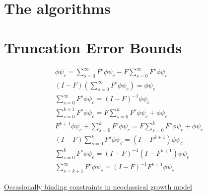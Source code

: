 \documentclass[12pt]{article}
\begin{document}
\appendix
\newpage

     
\section{The algorithms}
\label{sec:algorithms}



\section{Truncation Error Bounds}
\label{truncForm}
{
\begin{gather*}
\phi \psi_c=  \sum_{s=0}^\infty F^s \phi \psi_c  -   F \sum_{s=0}^\infty F^s \phi \psi_c \\
(I-F) \left (\sum_{s=0}^\infty F^s \phi \psi_c \right ) =\phi \psi_c\\
\sum_{s=0}^\infty F^s \phi \psi_c=(I - F)^{-1}\phi \psi_c\\
\sum_{s=0}^{k+1} F^s \phi \psi_c=F \sum_{s=0}^{k} F^s \phi \psi_c + \phi \psi_c\\
F^{k+1} \phi \psi_c +\sum_{s=0}^{k} F^s \phi \psi_c=F \sum_{s=0}^{k} F^s \phi \psi_c + \phi \psi_c\\
(I -F)\sum_{s=0}^{k} F^s\phi \psi_c  = (I- F^{k+1}) \phi \psi_c\\
\sum_{s=0}^{k} F^s \phi \psi_c = (I -F)^{-1}(I- F^{k+1}) \phi \psi_c\\
\sum_{s=k+1}^{\infty} F^s \phi \psi_c = (I -F)^{-1} F^{k+1}\phi \psi_c
\end{gather*}
}


\newpage

\href{http://www.dynare.org/DynareShanghai2013/deterministic.pdf}{Occasionally binding constraints in neoclassical growth model}

 
 
\end{document}
